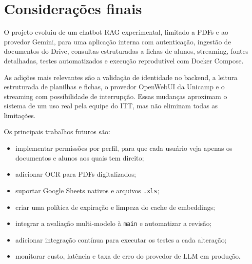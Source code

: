 \documentclass[12pt,a4paper]{article}
\begin{document}
\section{Considerações finais}

O projeto evoluiu de um chatbot RAG experimental, limitado a PDFs e ao provedor
Gemini, para uma aplicação interna com autenticação, ingestão de documentos do
Drive, consultas estruturadas a fichas de alunos, streaming, fontes detalhadas,
testes automatizados e execução reprodutível com Docker Compose.

As adições mais relevantes são a validação de identidade no backend, a leitura
estruturada de planilhas e fichas, o provedor OpenWebUI da Unicamp e o streaming
com possibilidade de interrupção. Essas mudanças aproximam o sistema de um uso real
pela equipe do ITT, mas não eliminam todas as limitações.

Os principais trabalhos futuros são:

\begin{itemize}
  \item implementar permissões por perfil, para que cada usuário veja apenas os
        documentos e alunos aos quais tem direito;
  \item adicionar OCR para PDFs digitalizados;
  \item suportar Google Sheets nativos e arquivos \texttt{.xls};
  \item criar uma política de expiração e limpeza do cache de embeddings;
  \item integrar a avaliação multi-modelo à \texttt{main} e automatizar a revisão;
  \item adicionar integração contínua para executar os testes a cada alteração;
  \item monitorar custo, latência e taxa de erro do provedor de LLM em produção.
\end{itemize}
\end{document}

